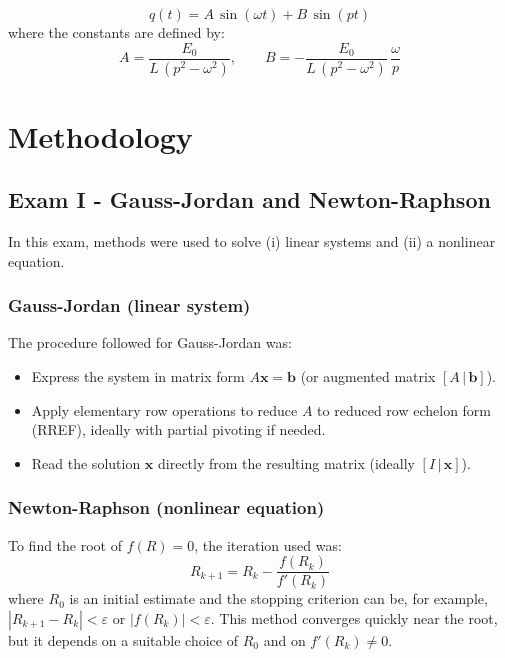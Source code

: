 \documentclass[pdflatex,sn-mathphys-num]{sn-jnl}%
\begin{document}
\begin{equation}
q(t)=A\,\sin(\omega t)+B\,\sin(pt)
\end{equation}
where the constants are defined by:
\begin{equation}
A=\frac{E_0}{L\,(p^2-\omega^2)},\qquad
B=-\frac{E_0}{L\,(p^2-\omega^2)}\,\frac{\omega}{p}
\end{equation}


\section{Methodology}
\subsection{Exam I - Gauss-Jordan and Newton-Raphson}
In this exam, methods were used to solve (i) linear systems and (ii) a nonlinear equation.

\subsubsection{Gauss-Jordan (linear system)}
The procedure followed for Gauss-Jordan was:
\begin{itemize}
    \item Express the system in matrix form $A\mathbf{x}=\mathbf{b}$ (or augmented matrix $[A\,|\,\mathbf{b}]$).
    \item Apply elementary row operations to reduce $A$ to reduced row echelon form (RREF), ideally with partial pivoting if needed.
    \item Read the solution $\mathbf{x}$ directly from the resulting matrix (ideally $[I\,|\,\mathbf{x}]$).
\end{itemize}

\subsubsection{Newton-Raphson (nonlinear equation)}
To find the root of $f(R)=0$, the iteration used was:
\begin{equation}
R_{k+1}=R_k-\frac{f(R_k)}{f'(R_k)}
\end{equation}
where $R_0$ is an initial estimate and the stopping criterion can be, for example, $|R_{k+1}-R_k|<\varepsilon$ or $|f(R_k)|<\varepsilon$. This method converges quickly near the root, but it depends on a suitable choice of $R_0$ and on $f'(R_k)\neq 0$.
\end{document}
